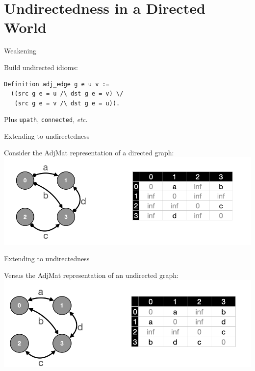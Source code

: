 \documentclass[usenames, xcolor=dvipsnames]{beamer}
\begin{document}
\section{Undirectedness in a Directed World}

\begin{frame}[fragile]{Weakening}

Build undirected idioms:

\begin{Verbatim}
Definition adj_edge g e u v :=
  ((src g e = u /\ dst g e = v) \/ 
   (src g e = v /\ dst g e = u)).
\end{Verbatim}

Plus \texttt{upath}, \texttt{connected}, \emph{etc.}

\end{frame}

\begin{frame}{Extending to undirectedness}

Consider the AdjMat representation of a directed graph: \\
\centering
\includegraphics[scale=0.7]{directed}

\end{frame}

\begin{frame}{Extending to undirectedness}

Versus the AdjMat representation of an undirected graph: \\
\centering
\includegraphics[scale=0.7]{undirected}

\end{frame}
\end{document}

